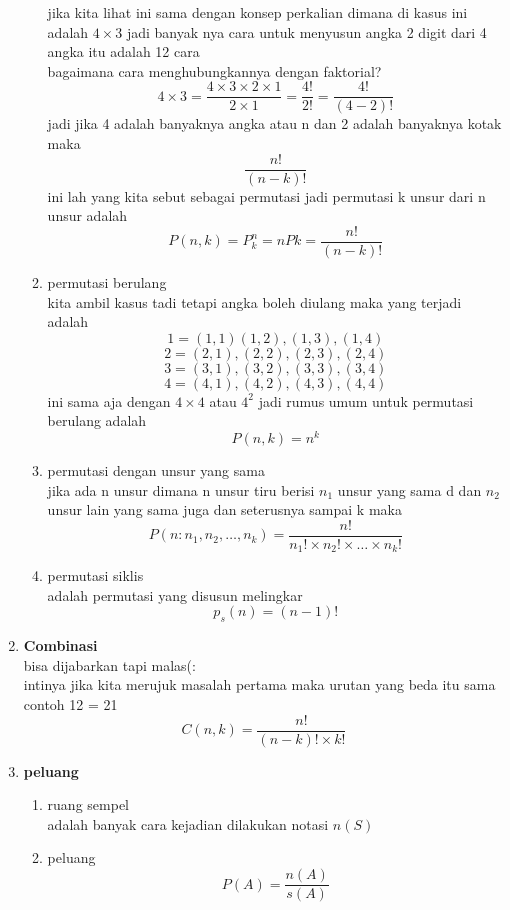 \documentclass[11pt]{article}
\begin{document}
\begin{enumerate}
\begin{enumerate}
        jika kita lihat ini sama dengan konsep perkalian dimana di kasus ini adalah $4\times 3$
        jadi banyak nya cara untuk menyusun angka 2 digit dari 4 angka itu adalah 12 cara\\
        bagaimana cara menghubungkannya dengan faktorial?\\
        $$4\times3 = \frac{4\times 3 \times 2 \times 1}{2\times 1} = \frac{4!}{2!} = \frac{4!}{(4-2)!}$$
        jadi jika 4 adalah banyaknya angka atau n dan 2 adalah
        banyaknya kotak  maka 
        $$\frac{n!}{(n-k)!}$$
        ini lah yang kita sebut sebagai permutasi jadi permutasi k unsur dari n unsur adalah
        $$P(n,k) = P_k^n = nPk = \frac{n!}{(n-k)!}$$
        \item permutasi berulang\\
        kita ambil kasus tadi tetapi angka boleh diulang maka yang terjadi adalah
        $$1 = {(1,1)(1,2),(1,3),(1,4)}$$
        $$2 = {(2,1),(2,2),(2,3),(2,4)}$$
        $$3 = {(3,1),(3,2),(3,3),(3,4)}$$
        $$4 = {(4,1),(4,2),(4,3),(4,4)}$$
        \newpage
        ini sama aja dengan $4\times 4$ atau $4^2$ jadi rumus umum untuk permutasi berulang adalah
        $$P(n,k) = n^k$$
        \item permutasi dengan unsur yang sama \\
        jika ada n unsur dimana n unsur tiru berisi $n_1$ unsur yang sama d
        dan $n_2$ unsur lain yang sama juga dan seterusnya sampai k maka
        $$P(n:n_1,n_2,\dots,n_k) = \frac{n!}{n_1!\times n_2!\times \dots \times n_k!}$$
        \item permutasi siklis \\ 
        adalah permutasi yang disusun melingkar
        $$p_s (n) = (n-1)!$$
    \end{enumerate}
    \item \textbf{Combinasi}\\
    bisa dijabarkan tapi malas(: \\
    intinya jika kita merujuk masalah pertama maka urutan yang beda itu sama contoh
    12 = 21
    $$C(n,k) = \frac{n!}{(n-k)!\times k!}$$
    \item \textbf{peluang}
    \begin{enumerate}
        \item ruang sempel\\
        adalah banyak cara kejadian dilakukan notasi $n(S)$
        \item peluang
        $$P(A)= \frac{n(A)}{s(A)}$$
        \begin{enumerate}

\end{enumerate}
\end{enumerate}
\end{enumerate}
\end{document}
